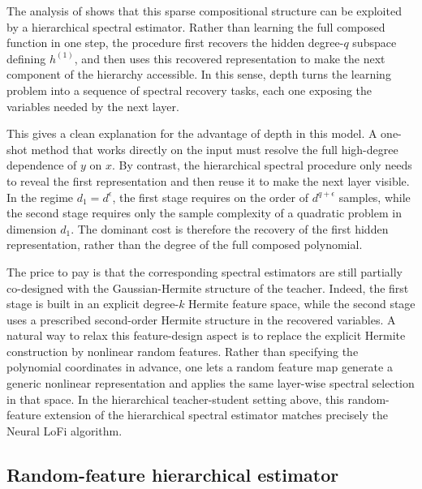 The analysis of \cite{tabanelli2026deep} shows that this sparse compositional structure can be exploited by a hierarchical spectral estimator. Rather than learning the full composed function in one step, the procedure first recovers the hidden degree-$q$ subspace defining $h^{(1)}$, and then uses this recovered representation to make the next component of the hierarchy accessible. In this sense, depth turns the learning problem into a sequence of spectral recovery tasks, each one exposing the variables needed by the next layer.

This gives a clean explanation for the advantage of depth in this model. A one-shot method that works directly on the input must resolve the full high-degree dependence of $y$ on $x$. By contrast, the hierarchical spectral procedure only needs to reveal the first representation and then reuse it to make the next layer visible. In the regime $d_1=d^\epsilon$, the first stage requires on the order of $d^{q+\epsilon}$ samples, while the second stage requires only the sample complexity of a quadratic problem in dimension $d_1$. The dominant cost is therefore the recovery of the first hidden representation, rather than the degree of the full composed polynomial.

The price to pay is that the corresponding spectral estimators are still partially co-designed with the Gaussian-Hermite structure of the teacher. Indeed, the first stage is built in an explicit degree-$k$ Hermite feature space, while the second stage uses a prescribed second-order Hermite structure in the recovered variables. A natural way to relax this feature-design aspect is to replace the explicit Hermite construction by nonlinear random features. Rather than specifying the polynomial coordinates in advance, one lets a random feature map generate a generic nonlinear representation and applies the same layer-wise spectral selection in that space. In the hierarchical teacher-student setting above, this random-feature extension of the hierarchical spectral estimator matches precisely the Neural LoFi algorithm.

\subsection{Random-feature hierarchical estimator}
\label{2605:app:rf-estimator}

